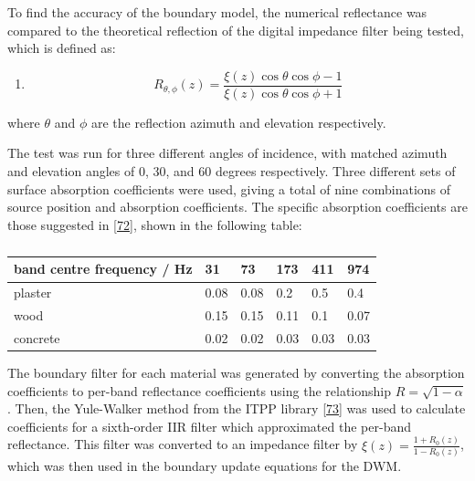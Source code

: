 \documentclass[]{scrreprt}
\providecommand{\tightlist}{%
  \setlength{\itemsep}{0pt}\setlength{\parskip}{0pt}}
\begin{document}
To find the accuracy of the boundary model, the numerical reflectance
was compared to the theoretical reflection of the digital impedance
filter being tested, which is defined as:

\begin{enumerate}
\def\labelenumi{(\arabic{enumi})}
\setcounter{enumi}{47}
\tightlist
\item
  \[R_{\theta, \phi}(z) = \frac{\xi(z)\cos\theta\cos\phi -
  1}{\xi(z)\cos\theta\cos\phi + 1}\]
\end{enumerate}

where \(\theta\) and \(\phi\) are the reflection azimuth and elevation
respectively.

The test was run for three different angles of incidence, with matched
azimuth and elevation angles of 0, 30, and 60 degrees respectively.
Three different sets of surface absorption coefficients were used,
giving a total of nine combinations of source position and absorption
coefficients. The specific absorption coefficients are those suggested
in
{[}\protect\hyperlink{ref-oxnardux5ffrequency-dependentux5f2015}{72}{]},
shown in the following table:

\begin{table}[ht]
\centering

\caption{}

\begin{tabular}{@{}llllll@{}}
\toprule

band centre frequency / Hz & 31 & 73 & 173 & 411 & 974 \\\midrule

plaster & 0.08 & 0.08 & 0.2 & 0.5 & 0.4 \\
wood & 0.15 & 0.15 & 0.11 & 0.1 & 0.07 \\
concrete & 0.02 & 0.02 & 0.03 & 0.03 & 0.03 \\

\bottomrule
\end{tabular}

\end{table}

The boundary filter for each material was generated by converting the
absorption coefficients to per-band reflectance coefficients using the
relationship \(R=\sqrt{1-\alpha}\). Then, the Yule-Walker method from
the ITPP library {[}\protect\hyperlink{ref-ux5fitppux5f2013}{73}{]} was
used to calculate coefficients for a sixth-order IIR filter which
approximated the per-band reflectance. This filter was converted to an
impedance filter by \(\xi(z)=\frac{1+R_0(z)}{1-R_0(z)}\), which was then
used in the boundary update equations for the DWM.
\end{document}
